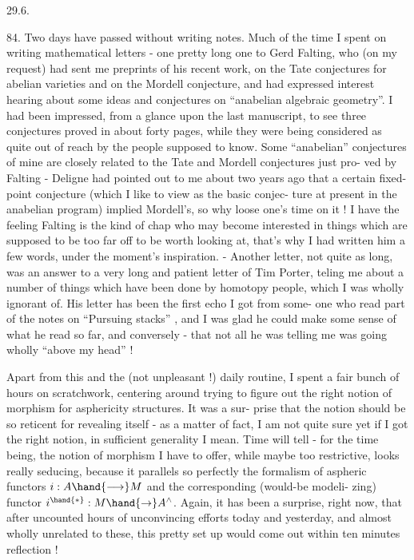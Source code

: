 
29.6.

84. Two days have passed without writing  notes. Much of the
time I spent on writing mathematical letters - one pretty long one to
Gerd Falting, who (on my request) had sent me preprints of his 
recent work, on the Tate conjectures for abelian varieties and on the
Mordell conjecture, and had expressed interest hearing about some ideas
and conjectures on ``anabelian algebraic geometry''. I had been impressed,
from a glance upon the last manuscript, to see three conjectures 
proved in about forty pages, while they were being considered as quite
out of reach by the people supposed to know. Some ``anabelian'' conjectures
of mine are closely related to the Tate and Mordell conjectures just pro-%
ved by Falting - Deligne had pointed out to me about two years ago that
a certain fixed-point conjecture (which I like to view as the basic conjec-%
ture at present in the anabelian program) implied Mordell's, so why loose
one's time on it ! I have the feeling Falting is the kind of chap who
may become interested in things which are supposed to be too far off to
be worth looking at, that's why I had written him a few words, under
the moment's inspiration. - Another letter, not quite as long, was an
answer to a very long and patient letter of Tim Porter, teling me about
a number of things which have been done by homotopy people, which I was
 wholly ignorant of. His letter has been the first echo I got from some-%
one who read part of the notes on ``Pursuing stacks'' , and I was glad he
could make some sense of what he read so far, and conversely - that not
all he was telling me was going wholly ``above my head'' !

Apart from this and the (not unpleasant !) daily routine, I spent
a fair bunch of hours on scratchwork, centering around trying to figure
out the right notion of morphism for asphericity structures. It was a sur-%
prise that the notion should be so reticent for revealing itself - as a
matter of fact, I am not quite sure yet if I got the right notion, in
sufficient generality I mean. Time will tell - for the time being,
the notion of morphism I have to offer, while maybe too restrictive,
looks really seducing, because it parallels so perfectly the formalism
of aspheric functors $i: A \hand{\longrightarrow} M$ and the corresponding (would-be modeli-%
zing) functor $i^{\hand{*}}: M \hand{\to} A^{\wedge}$. Again, it has been a surprise, right now,
that after uncounted hours of unconvincing efforts today and yesterday,
and almost wholly unrelated to these, this pretty set up would come out
within ten minutes reflection !

